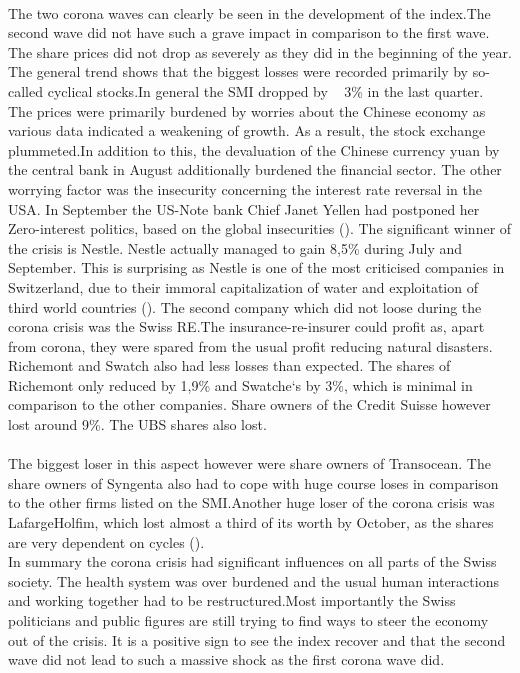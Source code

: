 \documentclass[11pt,a4paper]{article}
\begin{document}
\\
\newpage
The two corona waves can clearly be seen in the development of the index.The second wave did not have such a grave impact in comparison to the first wave. The share prices did not drop as severely as they did in the beginning of the year. The general trend shows that the biggest losses were recorded primarily by so-called cyclical stocks.In general the SMI dropped by ~ 3\% in the last quarter.\\
The prices were primarily burdened by worries about the Chinese economy as various data indicated a weakening of growth. As a result, the stock exchange plummeted.In addition to this, the devaluation of the Chinese currency yuan by the central bank in August additionally burdened the financial sector. The other worrying factor was the insecurity concerning the interest rate reversal in the USA. In September the US-Note bank Chief Janet Yellen had postponed her Zero-interest politics, based on the global insecurities (\cite{DOminicBenz}). 
The significant winner of the crisis is Nestle. Nestle actually managed to gain 8,5\% during July and September. This is surprising as Nestle is one of the most criticised companies in Switzerland, due to their immoral capitalization of water and exploitation of third world countries (\cite{JanaGlose}). The second company which did not loose during the corona crisis was the Swiss RE.The insurance-re-insurer could profit as, apart from corona, they were spared from the usual profit reducing natural disasters.\\
Richemont and Swatch also had less losses than expected. The shares of Richemont only reduced by 1,9\% and Swatche`s by 3\%, which is minimal in comparison to the other companies. 
Share owners of the Credit Suisse however lost around 9\%. The UBS shares also lost. 
\\
\\
The biggest loser in this aspect however were share owners of Transocean. The share owners of Syngenta also had to cope with huge course loses in comparison to the other firms listed on the SMI.Another huge loser of the corona crisis was LafargeHolfim, which lost almost a third of its worth by October, as the shares are very dependent on cycles (\citet{DOminicBenz}). 
\\
In summary the corona crisis had significant influences on all parts of the Swiss society. The health system was over burdened and the usual human interactions and working together had to be restructured.Most importantly the Swiss politicians and public figures are still trying to find ways to steer the economy out of the crisis. It is a positive sign to see the index recover and that the second wave did not lead to such a massive shock as the first corona wave did. 
\\
\newpage


\end{document}
